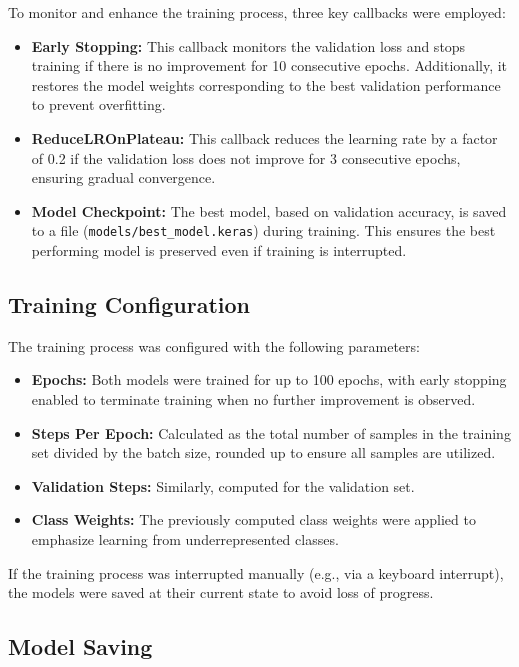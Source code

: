 \documentclass{article}
\begin{document}
To monitor and enhance the training process, three key callbacks were employed:
\begin{itemize}
    \item \textbf{Early Stopping:} This callback monitors the validation loss and stops training if there is no improvement for 10 consecutive epochs. Additionally, it restores the model weights corresponding to the best validation performance to prevent overfitting.
    \item \textbf{ReduceLROnPlateau:} This callback reduces the learning rate by a factor of 0.2 if the validation loss does not improve for 3 consecutive epochs, ensuring gradual convergence.
    \item \textbf{Model Checkpoint:} The best model, based on validation accuracy, is saved to a file (\texttt{models/best\_model.keras}) during training. This ensures the best performing model is preserved even if training is interrupted.
\end{itemize}

\subsection{Training Configuration}

The training process was configured with the following parameters:
\begin{itemize}
    \item \textbf{Epochs:} Both models were trained for up to 100 epochs, with early stopping enabled to terminate training when no further improvement is observed.
    \item \textbf{Steps Per Epoch:} Calculated as the total number of samples in the training set divided by the batch size, rounded up to ensure all samples are utilized.
    \item \textbf{Validation Steps:} Similarly, computed for the validation set.
    \item \textbf{Class Weights:} The previously computed class weights were applied to emphasize learning from underrepresented classes.
\end{itemize}

If the training process was interrupted manually (e.g., via a keyboard interrupt), the models were saved at their current state to avoid loss of progress.

\subsection{Model Saving}
\end{document}
